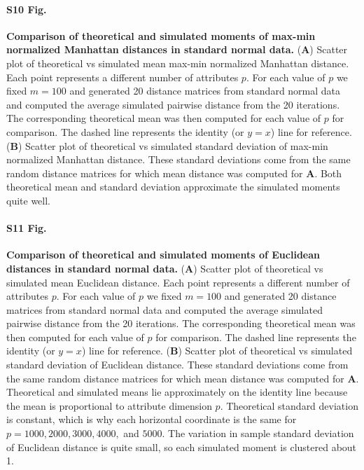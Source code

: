 \documentclass[10pt,letterpaper]{article}
\begin{document}
\paragraph*{S10 Fig.}
\hypertarget{S10_Fig}{
{\bf Comparison of theoretical and simulated moments of max-min normalized Manhattan distances in standard normal data.} (\textbf{A}) Scatter plot of theoretical vs simulated mean max-min normalized Manhattan distance. Each point represents a different number of attributes $p$. For each value of $p$ we fixed $m=100$ and generated 20 distance matrices from standard normal data and computed the average simulated pairwise distance from the 20 iterations. The corresponding theoretical mean was then computed for each value of $p$ for comparison. The dashed line represents the identity (or $y=x$) line for reference. (\textbf{B}) Scatter plot of theoretical vs simulated standard deviation of max-min normalized Manhattan distance. These standard deviations come from the same random distance matrices for which mean distance was computed for \textbf{A}. Both theoretical mean and standard deviation approximate the simulated moments quite well.}

\paragraph*{S11 Fig.}
\hypertarget{S11_Fig}{
{\bf Comparison of theoretical and simulated moments of Euclidean distances in standard normal data.} (\textbf{A}) Scatter plot of theoretical vs simulated mean Euclidean distance. Each point represents a different number of attributes $p$. For each value of $p$ we fixed $m=100$ and generated 20 distance matrices from standard normal data and computed the average simulated pairwise distance from the 20 iterations. The corresponding theoretical mean was then computed for each value of $p$ for comparison. The dashed line represents the identity (or $y=x$) line for reference. (\textbf{B}) Scatter plot of theoretical vs simulated standard deviation of Euclidean distance. These standard deviations come from the same random distance matrices for which mean distance was computed for \textbf{A}. Theoretical and simulated means lie approximately on the identity line because the mean is proportional to attribute dimension $p$. Theoretical standard deviation is constant, which is why each horizontal coordinate is the same for $p=1000,2000,3000,4000,$ and $5000$. The variation in sample standard deviation of Euclidean distance is quite small, so each simulated moment is clustered about 1.}
\end{document}
